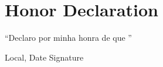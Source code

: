 \cleardoubleoddpage	
\chapter*{Honor Declaration}
\thispagestyle{empty} %

\enquote{Declaro por minha honra de que }

\vspace{4cm}

\hspace{2cm} Local, Date \hfill Signature \hspace{2cm}